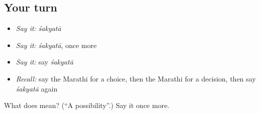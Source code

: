 \subsection*{Your turn}
\begin{itemize}
\raggedright
  \item \emph{Say it:} \emph{śakyatā}
  \item \emph{Say it:} \emph{śakyatā}, once more
  \item \emph{Say it:} say \emph{śakyatā}
  \item \emph{Recall:} say the Marathi for a choice, then the Marathi for a decision, then say \emph{śakyatā} again
\end{itemize}

\begin{tcolorbox}[breakable,colback=teal!4,colframe=teal!35!black,title={Before you move on}]
What does  mean? (\textquotedblleft{}A possibility\textquotedblright{}.) Say it once more.
\end{tcolorbox}
